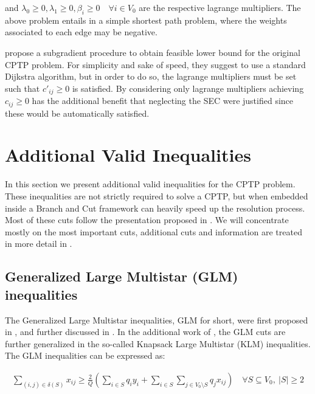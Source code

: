 and $\lambda_0 \ge 0, \lambda_1 \ge 0, \beta_i \ge 0 \quad \forall i \in V_0$ are the respective lagrange multipliers.
The above problem entails in a simple shortest path problem, where the weights associated to each edge may be negative.

\cite{beasley1989algorithm} propose a subgradient procedure to obtain feasible lower bound for the original CPTP problem.
For simplicity and sake of speed, they suggest to use a standard Dijkstra algorithm, but in order to do so, the lagrange multipliers must be set such that $c'_{ij} \ge 0$ is satisfied.
By considering only lagrange multipliers achieving $c_{ij} \ge 0$ has the additional benefit that neglecting the SEC were justified since these would be automatically satisfied.




\section{Additional Valid Inequalities}\label{sec:additional-valid-inequalities}

In this section we present additional valid inequalities for the CPTP problem.
These inequalities are not strictly required to solve a CPTP, but when embedded inside a Branch and Cut framework can heavily speed up the resolution process.
Most of these cuts follow the presentation proposed in \cite{Jepsen2014}.
We will concentrate mostly on the most important cuts, additional cuts and information are treated in more detail in \cite{Jepsen2014}.

\subsection{Generalized Large Multistar (GLM) inequalities}
The Generalized Large Multistar inequalities, GLM for short, were first proposed in \cite{gouveia_result_1995}, and further discussed in \cite{letchford2006projection}.
In the additional work of \cite{letchford_multistars_2002}, the GLM cuts are further generalized in the so-called Knapsack Large Multistar (KLM) inequalities.
The GLM inequalities can be expressed as:

\begin{equation}\label{eq:glm-inequality-v1}
	\begin{split}
		\sum_{(i, j) \in \delta(S)} x_{ij} \ge \frac{2}{Q} \left(  \sum_{i \in S} q_i y_i + \sum_{i \in S} \sum_{j \in V_0 \setminus S} q_j  x_{ij}\right) \quad \forall S \subseteq V_0,\ |S| \ge 2
	\end{split}
\end{equation}

